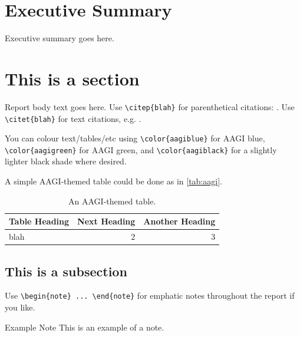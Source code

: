 \documentclass[12pt]{article}
\begin{document}
  \clearpage
  \pagestyle{plain}
  \setcounter{page}{1}
  \tableofcontents


  \clearpage
  \section*{Executive Summary}
  Executive summary goes here.

  \mainmatter
  \pagestyle{fancy}

  \clearpage
  \section{This is a section}
  
  Report body text goes here. Use \verb|\citep{blah}| for parenthetical
  citations: \citep{blah}. Use \verb|\citet{blah}| for text citations, e.g.
  \citet{blah}.
  
  You can colour text/tables/etc using \verb|\color{aagiblue}|
  for {\color{aagiblue}AAGI blue}, \verb|\color{aagigreen}| for
  {\color{aagigreen}AAGI green}, and \verb|\color{aagiblack}| for
  a {\color{aagiblack}slightly lighter black shade} where desired.
  
  A simple AAGI-themed table could be done as in \autoref{tab:aagi}.
  \begin{table}[h]
    \caption{An AAGI-themed table.}\label{tab:aagi}
    \centering
    \begin{tabular}{| l | r r |}
    \rowcolor{aagiblue} {\color{white}Table Heading} & %
    {\color{white}Next Heading} & {\color{white}Another Heading} \\
    \hline
    blah & 2 & 3 \\
    \hline
    \end{tabular}
  \end{table}

  \subsection{This is a subsection}
  Use \verb|\begin{note} ... \end{note}| for emphatic notes throughout
  the report if you like.
  
  \begin{note}
    {\sbf\color{aagiblue!75!black} Example Note}\quad
    This is an example of a note.
  \end{note}
\end{document}
